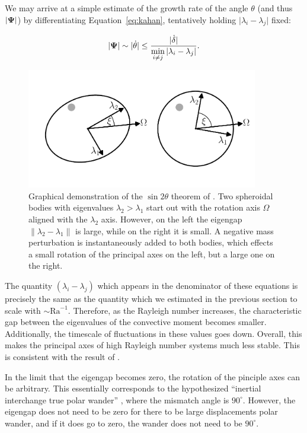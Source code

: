 \documentclass[extra,mreferee]{gji}
\begin{document}
We may arrive at a simple estimate of the growth rate of the angle $\theta$ (and thus $\vert \mitbf{\Psi} \vert$) 
by differentiating Equation~\eqref{eq:kahan}, tentatively holding $\vert \lambda_i - \lambda_j \vert$ fixed:

\begin{equation}
\vert \mitbf{\Psi} \vert \sim \vert \dot{\theta} \vert \le \frac{ \vert \dot{\delta} \vert}{ \displaystyle \min_{i \neq j} \vert \lambda_i - \lambda_j \vert }.
\label{eq:grow_perturbation}
\end{equation} 

\begin{figure}
\centering
\includegraphics[width=0.9\textwidth]{figures/perturb.pdf}
\caption{Graphical demonstration of the $\sin{2 \theta}$ theorem of \citet{davis1970rotation}.  Two spheroidal bodies with eigenvalues $\lambda_2 > \lambda_1$ start out with the rotation axis $\Omega$ aligned with the $\lambda_2$ axis. However, on the left the eigengap $\lVert \lambda_2 - \lambda_1 \rVert$ is large, while on the right it is small.  A negative mass perturbation is instantaneously added to both bodies, which effects a small rotation of the principal axes on the left, but a large one on the right.}
\label{fig:perturb}
\end{figure}

The quantity $(\lambda_i-\lambda_j)$ which appears in the denominator of these equations is precisely the same as the quantity which we estimated in the previous section to scale with $\sim \mathrm{Ra}^{-1}$.
Therefore, as the Rayleigh number increases, the characteristic gap between the eigenvalues of the convective moment becomes smaller.  
Additionally, the timescale of fluctuations in these values goes down. 
Overall, this makes the principal axes of high Rayleigh number systems much less stable.
This is consistent with the result of \citet{richards1999polar}.

In the limit that the eigengap becomes zero, the rotation of the pinciple axes can be arbitrary. 
This essentially corresponds to the hypothesized ``inertial interchange true polar wander'' \citep{kirschvink1997evidence}, where 
the mismatch angle is $90^\circ$. However, the eigengap does not need to be zero for there to be large displacements polar wander, 
and if it does go to zero, the wander does not need to be $90^\circ$.
\end{document}
